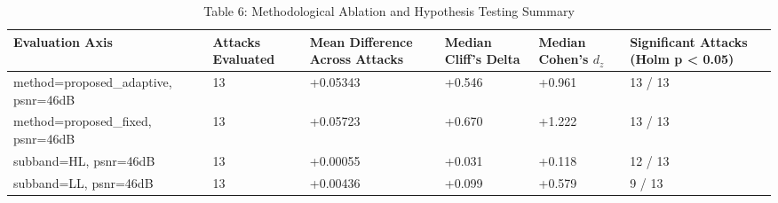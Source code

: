 \begin{table}[htbp]
\centering
\caption{Table 6: Methodological Ablation and Hypothesis Testing Summary}
\begin{tabular}{llllll}
\toprule
Evaluation Axis & Attacks Evaluated & Mean Difference Across Attacks & Median Cliff's Delta & Median Cohen's $d_z$ & Significant Attacks (Holm p < 0.05) \\
\midrule
method=proposed\_adaptive, psnr=46dB & 13 & +0.05343 & +0.546 & +0.961 & 13 / 13 \\
method=proposed\_fixed, psnr=46dB & 13 & +0.05723 & +0.670 & +1.222 & 13 / 13 \\
subband=HL, psnr=46dB & 13 & +0.00055 & +0.031 & +0.118 & 12 / 13 \\
subband=LL, psnr=46dB & 13 & +0.00436 & +0.099 & +0.579 & 9 / 13 \\
\bottomrule
\end{tabular}
\end{table}
